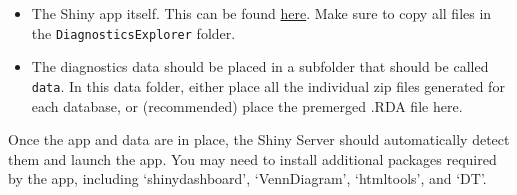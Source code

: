 \documentclass[
]{article}
\begin{document}
\begin{itemize}
\item
  The Shiny app itself. This can be found
  \href{https://github.com/OHDSI/CohortDiagnostics/tree/master/inst/shiny/DiagnosticsExplorer}{here}.
  Make sure to copy all files in the \texttt{DiagnosticsExplorer}
  folder.
\item
  The diagnostics data should be placed in a subfolder that should be
  called \texttt{data}. In this data folder, either place all the
  individual zip files generated for each database, or (recommended)
  place the premerged .RDA file here.
\end{itemize}

Once the app and data are in place, the Shiny Server should
automatically detect them and launch the app. You may need to install
additional packages required by the app, including `shinydashboard',
`VennDiagram', `htmltools', and `DT'.
\end{document}
